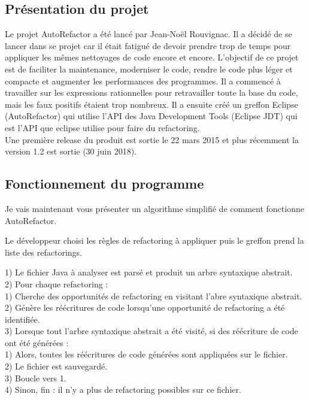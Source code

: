 \documentclass[a4paper,twoside,12pt,openright]{report}
\begin{document}
\subsection{Présentation du projet}
Le projet AutoRefactor a été lancé par Jean-Noël Rouvignac. Il a décidé de se lancer dans se projet car il était fatigué de devoir prendre trop de temps pour appliquer les mêmes nettoyages de code encore et encore. L'objectif de ce projet est de faciliter la maintenance, moderniser le code, rendre le code plus léger et compacte et augmenter les performances des programmes. Il a commencé à travailler sur les expressions rationnelles pour retravailler toute la base du code, mais les faux positifs étaient trop nombreux.\cite{ref7} Il a ensuite créé un greffon Eclipse (AutoRefactor) qui utilise  l'API des Java Development Tools (Eclipse JDT) qui est l'API que eclipse utilise pour faire du refactoring.\\
Une première release du produit est sortie le 22 mars 2015 et plus récemment la version 1.2 est sortie (30 juin 2018).

\subsection{Fonctionnement du programme}
Je vais maintenant vous présenter un algorithme simplifié de comment fonctionne AutoRefactor.

Le développeur choisi les règles de refactoring à appliquer puis le greffon prend la liste des refactorings.

1) Le fichier Java à analyser est parsé et produit un arbre syntaxique abstrait.\\

2) Pour chaque refactoring :\\
\tabto{0.8cm} 1) Cherche des opportunités de refactoring en visitant l'abre syntaxique abstrait.\\
\tabto{0.8cm} 2) Génère les réécritures de code lorsqu'une  opportunité de refactoring a été identifiée.\\

3) Lorsque tout l'arbre syntaxique abstrait a été visité, si des réécriture de code ont été générées :\\
\tabto{0.8cm} 1) Alors, toutes les réécritures de code générées sont appliquées sur le fichier.\\
\tabto{0.8cm} 2) Le fichier est sauvegardé.\\
\tabto{0.8cm} 3) Boucle vers 1.\\
\tabto{0.8cm} 4) Sinon, fin : il n'y a plus de refactoring possibles sur ce fichier.\\
\end{document}
